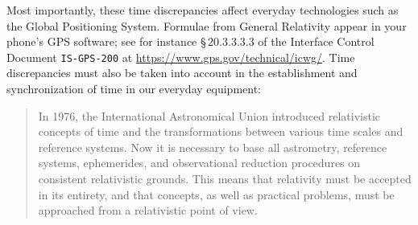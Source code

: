 \documentclass[a4paper,12pt,%
onecolumn,oneside,%
british%
]{memoir}
\renewcommand*{\|}[1][]{\nonscript\:#1\vert\nonscript\:\mathopen{}}
\newcommand*{\sect}{\S}%
\begin{document}
Most importantly, these time discrepancies affect everyday technologies such as the Global Positioning System. Formulae from General Relativity appear in your phone's GPS software; see for instance \sect\,20.3.3.3.3 of the Interface Control Document \texttt{IS-GPS-200} at \url{https://www.gps.gov/technical/icwg/}. Time discrepancies must also be taken into account in the establishment and synchronization of time in our everyday equipment:
\begin{quote}\footnotesize
  In 1976, the International Astronomical Union introduced relativistic concepts of time and the transformations between various time scales and reference systems. \textelp{} Now \textelp{} it is necessary to base all astrometry, reference systems, ephemerides, and observational reduction procedures on consistent relativistic grounds. This means that relativity must be accepted in its entirety, and that concepts, as well as practical problems, must be approached from a relativistic point of view.
\end{quote}
%
\end{document}
